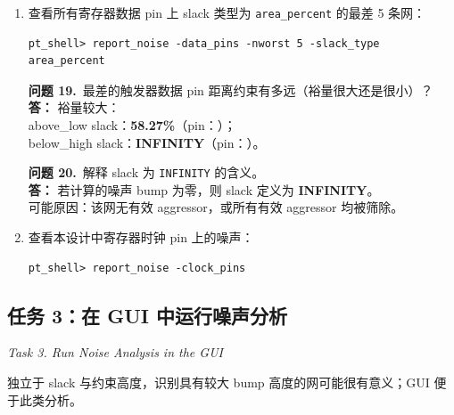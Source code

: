 \begin{enumerate}
  \item 查看所有寄存器数据 pin 上 slack 类型为 \texttt{area\_percent} 的最差 5 条网：
\begin{lstlisting}
pt_shell> report_noise -data_pins -nworst 5 -slack_type area_percent
\end{lstlisting}

\begin{questionBox}
\textbf{问题 19.}\ 最差的触发器数据 pin 距离约束有多远（裕量很大还是很小）？\\[0.35em]
\textbf{答：} 裕量较大：\\
above\_low slack：\textbf{58.27\%}（pin：）；\\
below\_high slack：\textbf{INFINITY}（pin：）。

\textbf{问题 20.}\ 解释 slack 为 \texttt{INFINITY} 的含义。\\[0.35em]
\textbf{答：} 若计算的噪声 bump 为零，则 slack 定义为 \textbf{INFINITY}。\\
可能原因：该网无有效 aggressor，或所有有效 aggressor 均被筛除。
\end{questionBox}

  \item 查看本设计中寄存器时钟 pin 上的噪声：
\begin{lstlisting}
pt_shell> report_noise -clock_pins
\end{lstlisting}
\end{enumerate}

\subsection{任务 3：在 GUI 中运行噪声分析}
\label{lab9:task3}

\noindent\textit{Task 3. Run Noise Analysis in the GUI}

独立于 slack 与约束高度，识别具有较大 bump 高度的网可能很有意义；GUI 便于此类分析。

